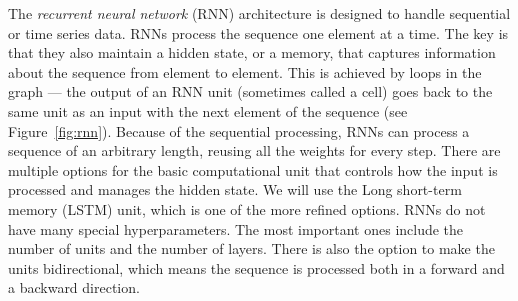 The \textit{recurrent neural network} (RNN) architecture is designed to handle sequential or time series data. RNNs process the sequence one element at a time. The key is that they also maintain a hidden state, or a memory, that captures information about the sequence from element to element. This is achieved by loops in the graph --- the output of an RNN unit (sometimes called a cell) goes back to the same unit as an input with the next element of the sequence (see Figure~\ref{fig:rnn}). Because of the sequential processing, RNNs can process a sequence of an arbitrary length, reusing all the weights for every step. There are multiple options for the basic computational unit that controls how the input is processed and manages the hidden state. We will use the Long short-term memory (LSTM) unit, which is one of the more refined options. RNNs do not have many special hyperparameters. The most important ones include the number of units and the number of layers. There is also the option to make the units bidirectional, which means the sequence is processed both in a forward and a backward direction.

